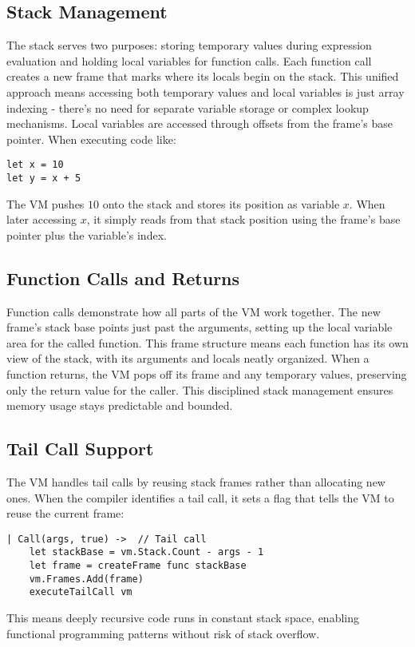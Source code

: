\subsection{Stack Management}\label{subsec:stack-management}

The stack serves two purposes: storing temporary values during expression evaluation and holding local variables for function calls.
Each function call creates a new frame that marks where its locals begin on the stack.
This unified approach means accessing both temporary values and local variables is just array indexing - there's no 
need for separate variable storage or complex lookup mechanisms.
Local variables are accessed through offsets from the frame's base pointer.
When executing code like:

\begin{verbatim}
let x = 10
let y = x + 5
\end{verbatim}

The VM pushes $10$ onto the stack and stores its position as variable $x$.
When later accessing $x$, it simply reads 
from that stack position using the frame's base pointer plus the variable's index.

\subsection{Function Calls and Returns}\label{subsec:function-calls-and-returns}

Function calls demonstrate how all parts of the VM work together.
The new frame's stack base points just past the arguments, setting up the local variable area for the called function. 
This frame structure means each function has its own view of the stack, with its arguments and locals neatly organized.
When a function returns, the VM pops off its frame and any temporary values, preserving only the return value for the caller.
This disciplined stack management ensures memory usage stays predictable and bounded.

\subsection{Tail Call Support}\label{subsec:tail-call-support}

The VM handles tail calls by reusing stack frames rather than allocating new ones.
When the compiler identifies a tail call, it sets a flag that tells the VM to reuse the current frame:

\begin{verbatim}
| Call(args, true) ->  // Tail call
    let stackBase = vm.Stack.Count - args - 1
    let frame = createFrame func stackBase
    vm.Frames.Add(frame)
    executeTailCall vm
\end{verbatim}
This means deeply recursive code runs in constant stack space, enabling functional programming patterns without risk of stack overflow.


